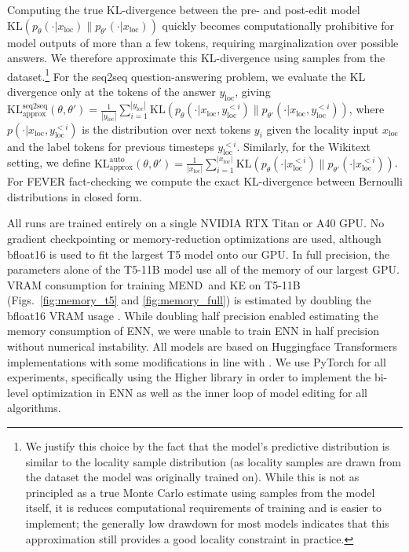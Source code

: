 \documentclass{article}
\makeatletter
\newcommand{\name}{MEND}
\newcommand{\xloc}{x_\text{loc}}
\newcommand{\yloc}{y_\text{loc}}
\let\origsubsection\subsection
\renewcommand\subsection{\@ifstar{\starsubsection}{\nostarsubsection}}
\newcommand\nostarsubsection[1]
{\subsectionprelude\origsubsection{#1}\subsectionpostlude}
\newcommand\starsubsection[1]
{\subsectionprelude\origsubsection*{#1}\subsectionpostlude}
\newcommand\subsectionprelude{%
  \vspace{-1.5mm}
}
\newcommand\subsectionpostlude{%
  \vspace{-1.5mm}
}
\makeatother
\begin{document}
\begin{appendix}
\subsection{Computing the locality constraint}
\label{sec:locality}
Computing the true KL-divergence between the pre- and post-edit model $\text{KL}(p_\theta(\cdot | \xloc) \| p_{\theta'}(\cdot | \xloc))$ quickly becomes computationally prohibitive for model outputs of more than a few tokens, requiring marginalization over possible answers. We therefore approximate this KL-divergence using samples from the dataset.\footnote{We justify this choice by the fact that the model's predictive distribution is similar to the locality sample distribution (as locality samples are drawn from the dataset the model was originally trained on). While this is not as principled as a true Monte Carlo estimate using samples from the model itself, it is reduces computational requirements of training and is easier to implement; the generally low drawdown for most models indicates that this approximation still provides a good locality constraint in practice.} For the seq2seq question-answering problem, we evaluate the KL divergence only at the tokens of the answer $\yloc$, giving $\text{KL}_\text{approx}^\text{seq2seq}(\theta,\theta') = \frac{1}{|\yloc|}\sum_{i=1}^{|\yloc|}\text{KL}(p_\theta(\cdot | \xloc, \yloc^{<i}) \| p_{\theta'}(\cdot | \xloc,\yloc^{<i}))$, where $p(\cdot | \xloc, \yloc^{<i})$ is the distribution over next tokens $y_i$ given the locality input $\xloc$ and the label tokens for previous timesteps $\yloc^{<i}$. Similarly, for the Wikitext setting, we define $\text{KL}_\text{approx}^\text{auto}(\theta,\theta') = \frac{1}{|\xloc|}\sum_{i=1}^{|\xloc|}\text{KL}(p_\theta(\cdot | \xloc^{<i}) \| p_{\theta'}(\cdot | \xloc^{<i}))$. For FEVER fact-checking we compute the exact KL-divergence between Bernoulli distributions in closed form. 

\subsection{Environment Details}
\label{sec:environment-details}
All runs are trained entirely on a single NVIDIA RTX Titan or A40 GPU. No gradient checkpointing or memory-reduction optimizations are used, although bfloat16 is used to fit the largest T5 model onto our GPU. In full precision, the parameters alone of the T5-11B model use all of the memory of our largest GPU. VRAM consumption for training \name~and KE on T5-11B (Figs.~\ref{fig:memory_t5} and \ref{fig:memory_full}) is estimated by doubling the bfloat16 VRAM usage \citep{bfloat16}. While doubling half precision enabled estimating the memory consumption of ENN, we were unable to train ENN in half precision without numerical instability. All models are based on Huggingface Transformers implementations \citep{wolf2019hugging} with some modifications in line with \cite{Cao2021EditingFK}. We use PyTorch \citep{NEURIPS2019_9015} for all experiments, specifically using the Higher library \citep{grefenstette2019generalized} in order to implement the bi-level optimization in ENN as well as the inner loop of model editing for all algorithms. 


\end{appendix}
\end{document}
